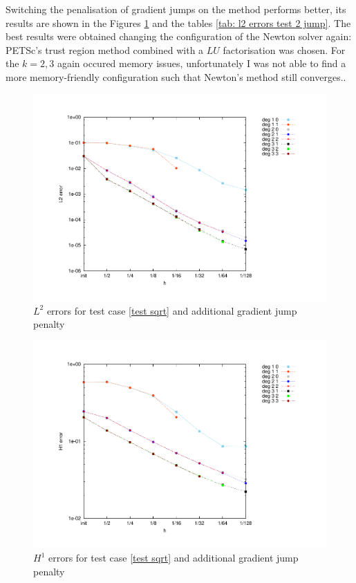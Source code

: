 Switching the penalisation of gradient jumps on the method performs better, its results are shown in the Figures \ref{fig: l2 errors test 2 jump} and the tables \ref{tab: l2 errors test 2 jump}. The best results were obtained changing the configuration of the Newton solver again: PETSc's trust region method combined with a $LU$ factorisation was chosen. For the $k=2,3$ again occured memory issues, unfortunately I was not able to find a more memory-friendly configuration such that Newton's method still converges..

\begin{figure}[H]
	\centering
	\includegraphics[scale =0.4]{plots/MA2_Neilan_GradJump_l2.pdf}
	\caption{$L^2$ errors for test case \ref{test sqrt}  and additional gradient jump penalty}
	\label{fig: l2 errors test 2 jump}
\end{figure}
\begin{figure}[H]
	\centering
	\includegraphics[scale =0.4]{plots/MA2_Neilan_GradJump_h1.pdf}
	\caption{$H^1$ errors for test case \ref{test sqrt}  and additional gradient jump penalty}
	\label{fig: h1 errors test 2 jump}
\end{figure}
